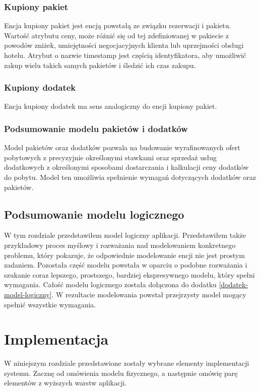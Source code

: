 \documentclass[a4paper,onecolumn,oneside,11pt,wide,floatssmall]{mwrep}
\theoremstyle{definition}
\theoremstyle{plain}%
\theoremstyle{remark}
\begin{document}
\subsection{Kupiony pakiet}
Encja kupiony pakiet jest encją powstałą ze związku rezerwacji i pakietu. Wartość atrybutu ceny, może różnić się od tej zdefiniowanej w pakiecie z powodów zniżek, umiejętności negocjacyjnych klienta lub uprzejmości obsługi hotelu. Atrybut o nazwie timestamp jest częścią identyfikatora, aby umożliwić zakup wielu takich samych pakietów i śledzić ich czas zakupu.

\subsection{Kupiony dodatek}
Encja kupiony dodatek ma sens analogiczny do encji kupiony pakiet.

\subsection{Podsumowanie modelu pakietów i dodatków}
Model pakietów oraz dodatków pozwala na budowanie wyrafinowanych ofert pobytowych z precyzyjnie określonymi stawkami oraz sprzedaż usług dodatkowych z określonymi sposobami dostarczania i kalkulacji ceny dodatków do pobytu. Model ten umożliwia spełnienie wymagań dotyczących dodatków oraz pakietów.

\section{Podsumowanie modelu logicznego}
W tym rozdziale przedstawiłem model logiczny aplikacji. Przedstawiłem także przykładowy proces myślowy i rozważania nad modelowaniem konkretnego problemu, który pokazuje, że odpowiednie modelowanie encji nie jest prostym zadaniem. Pozostała część modelu powstała w oparciu o podobne rozważania i szukanie coraz lepszego, prostszego, bardziej ekspresywnego modelu, który spełni wymagania. Całość modelu logicznego została dołączona do dodatku \ref{dodatek-model-logiczny}. W rezultacie modelowania powstał przejrzysty model mogący spełnić wszystkie wymagania.

\chapter{Implementacja}
W niniejszym rozdziale przedstawione zostały wybrane elementy implementacji systemu. Zacznę od omówienia modelu fizycznego, a następnie omówię parę elementów z wyższych warstw aplikacji. 
\end{document}
